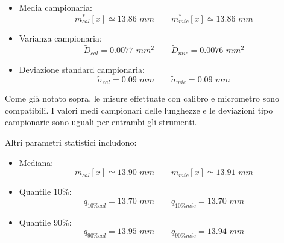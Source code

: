 \begin{itemize}
    \item{Media campionaria:}
        \begin{equation*}
        m^*_{cal}[x] \simeq 13.86\,\,mm \qquad
        m^*_{mic}[x] \simeq 13.86\,\,mm 
        \end{equation*}

    \item{Varianza campionaria:}
        \begin{equation*}
        \tilde{D}_{cal} = 0.0077\,\,mm^2 \qquad
        \tilde{D}_{mic} = 0.0076\,\,mm^2
        \end{equation*}

    \item{Deviazione standard campionaria:}
        \begin{equation*}
        \tilde{\sigma}_{cal} = 0.09\,\,mm \qquad
        \tilde{\sigma}_{mic} = 0.09\,\,mm
        \end{equation*}
\end{itemize}

Come già notato sopra, le misure effettuate con calibro e micrometro sono compatibili.
I valori medi campionari delle lunghezze e le deviazioni tipo campionarie sono
uguali per entrambi gli strumenti.

Altri parametri statistici includono:

\begin{itemize}
    \item{Mediana:}
        \begin{equation*}
        m_{cal}[x] \simeq 13.90\,\,mm \qquad
        m_{mic}[x] \simeq 13.91\,\,mm 
        \end{equation*}

    \item{Quantile 10\%:}
        \begin{equation*}
        q_{10\%cal} = 13.70\,\,mm \qquad
        q_{10\%mic} = 13.70\,\,mm
        \end{equation*}

    \item{Quantile 90\%:}
        \begin{equation*}
        q_{90\%cal} = 13.95\,\,mm \qquad
        q_{90\%mic} = 13.94\,\,mm
        \end{equation*}
\end{itemize}

